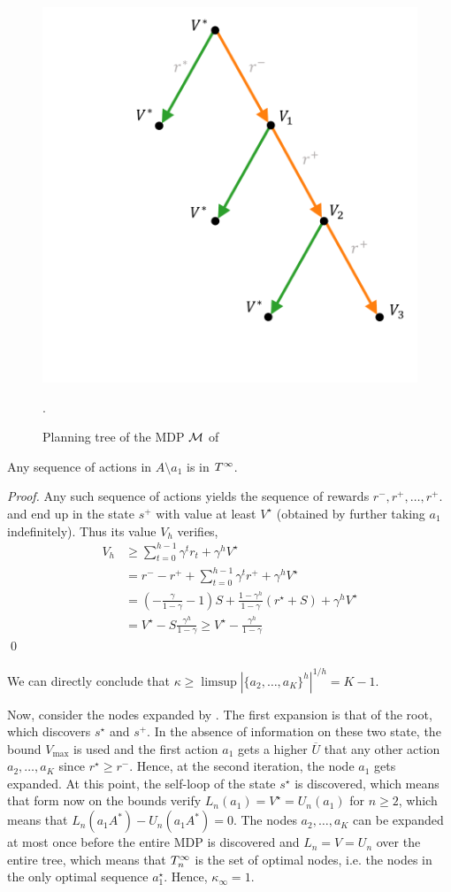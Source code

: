 \documentclass[runningheads]{llncs}
\begin{document}
\begin{figure}
    \centering
    \includegraphics[trim={3.5cm 2cm 0.5cm 0.5cm}, clip, width=0.5\linewidth]{img/mdp_tree.pdf}
    \caption{Planning tree of the MDP $\mathcal{M}$ of }.
    \label{fig:mdp-tree}
\end{figure}
\begin{lemma}
 Any sequence of actions in $A\setminus{a_1}$ is in $T^\infty$.
\end{lemma}
\begin{proof}
Any such sequence of actions yields the sequence of rewards $r^-, r^+, \dots,r^+$. and end up in the state $s^+$ with value at least $V^\star$ (obtained by further taking $a_1$ indefinitely). Thus its value $V_h$ verifies, 
\begin{align*}
    V_h &\geq \sum_{t=0}^{h-1} \gamma^t r_t + \gamma^h V^\star\\
    &= r^- - r^+ + \sum_{t=0}^{h-1} \gamma^t r^+ + \gamma^h V^\star \\
    &= (-\frac{\gamma}{1-\gamma} - 1)S + \frac{1-\gamma^h}{1-\gamma} (r^\star + S) + \gamma^h V^\star\\
    &= V^\star - S\frac{\gamma^h}{1-\gamma} \geq V^\star - \frac{\gamma^h}{1-\gamma}
\end{align*}
\qed\end{proof}

We can directly conclude that $\kappa \geq \limsup{|\{a_2,\dots,a_K\}^h|^{1/h}} = K-1$.

Now, consider the nodes expanded by \GBOPD. The first expansion is that of the root, which discovers $s^\star$ and $s^+$. In the absence of information on these two state, the bound $V_{\max}$ is used and the first action $a_1$ gets a higher $\overline{U}$ that any other action $a_2,\dots,a_K$ since $r^\star \geq r^-$. Hence, at the second iteration, the node $a_1$ gets expanded. At this point, the self-loop of the state $s^\star$ is discovered, which means that form now on the bounds verify $L_n(a_1) = V^\star = U_n(a_1)$ for $n\geq2$, which means that $L_n(a_1A^*)-U_n(a_1A^*) = 0$. The nodes $a_2,\dots,a_K$ can be expanded at most once before the entire MDP is discovered and $L_n=V=U_n$ over the entire tree, which means that $T_n^\infty$ is the set of optimal nodes, i.e. the nodes in the only optimal sequence $a_1^\star$. Hence, $\kappa_\infty = 1.$ 
\end{document}
